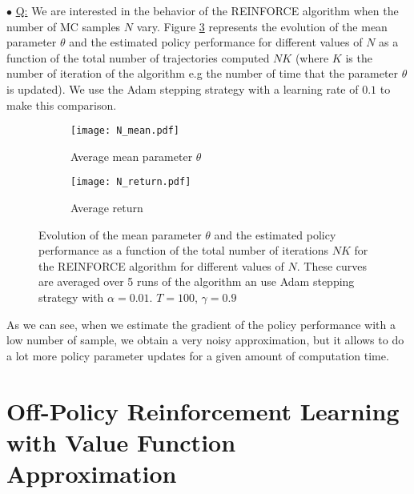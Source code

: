 \documentclass[a4paper, 11pt]{article}
\newcounter{cquestion}
\renewcommand{\thecquestion}{\arabic{cquestion}}
\newenvironment{question}
{\par \vspace{0.5em} \noindent \stepcounter{cquestion} \hspace{-1em}
 $\bullet$ \underline{Q\thecquestion :}}
{}
\begin{document}
\begin{question}
  We are interested in the behavior of the REINFORCE algorithm when
  the number of MC samples $N$ vary. Figure \ref{fig:N-comparison} represents the
  evolution of the mean parameter $\theta$ and the estimated policy
  performance for different values of $N$ as a function of the
  total number of trajectories computed $N K$ (where $K$ is the number
  of iteration of the algorithm e.g the number of time that the
  parameter $\theta$ is updated). We use the Adam stepping strategy
  with a learning rate of $0.1$ to make this comparison.


  \begin{figure}[ht]
    \centering
    \begin{subfigure}[t]{0.48\textwidth}
      \centering
      \texttt{[image: N\_mean.pdf]}
      \caption{Average mean parameter $\theta$}\label{fig:N-mean.pdf}
    \end{subfigure}
    \quad
    \begin{subfigure}[t]{0.48\textwidth}
      \centering
      \texttt{[image: N\_return.pdf]}
      \caption{Average return}\label{fig:N-return.pdf}
    \end{subfigure}
    \caption{Evolution of the mean parameter $\theta$ and the
      estimated policy performance as a function of the total number
      of iterations $N K$ for the REINFORCE algorithm for different
      values of $N$. These curves are averaged over 5 runs of the
      algorithm an use Adam stepping strategy with $\alpha = 0.01$.
      $T = 100$, $\gamma = 0.9$}\label{fig:N-comparison}
  \end{figure}

  As we can see, when we estimate the gradient of the policy
  performance with a low number of sample, we obtain a very noisy
  approximation, but it allows to do a lot more policy parameter
  updates for a given amount of computation time.

\end{question}

\section{Off-Policy Reinforcement Learning with Value Function Approximation}
\end{document}
